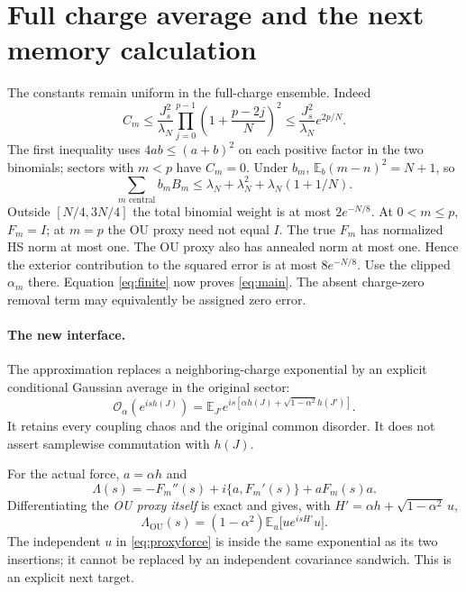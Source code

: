 \documentclass[11pt,a4paper]{article}
\newcommand{\EE}{\mathbb E}
\begin{document}
\newpage
\section{Full charge average and the next memory calculation}
The constants remain uniform in the full-charge ensemble. Indeed
\begin{equation}
 C_m\le\frac{J_s^2}{\lambda_N}
 \prod_{j=0}^{p-1}\left(1+\frac{p-2j}{N}\right)^2
 \le\frac{J_s^2}{\lambda_N}e^{2p/N}.
\end{equation}
The first inequality uses $4ab\le(a+b)^2$ on each positive factor
in the two binomials; sectors with $m<p$ have $C_m=0$.
Under $b_m$, $\EE_b(m-n)^2=N+1$, so
\begin{equation}
 \sum_{m\text{ central}}b_m B_m
 \le\lambda_N+\lambda_N^2+\lambda_N(1+1/N).
\end{equation}
Outside $[N/4,3N/4]$ the total binomial weight is at most
$2e^{-N/8}$. At $0<m\le p$, $F_m=I$; at $m=p$ the OU proxy
need not equal $I$. The true $F_m$ has normalized HS norm at most one.
The OU proxy also has annealed norm at most one. Hence the exterior
contribution to the squared error is at most $8e^{-N/8}$.
Use the clipped $\alpha_m$ there. Equation \eqref{eq:finite} now
proves \eqref{eq:main}. The absent charge-zero removal term may
equivalently be assigned zero error.

\paragraph{The new interface.}
The approximation replaces a neighboring-charge exponential by an
explicit conditional Gaussian average in the original sector:
\begin{equation}
 \mathcal O_\alpha(e^{ish(J)})
 =\EE_{J'}e^{is[\alpha h(J)+\sqrt{1-\alpha^2}h(J')]}.
\end{equation}
It retains every coupling chaos and the original common disorder.
It does not assert samplewise commutation with $h(J)$.

For the actual force, $a=\alpha h$ and
\begin{equation}
 \Lambda(s)=-F_m''(s)+i\{a,F_m'(s)\}+aF_m(s)a.
\end{equation}
Differentiating the \emph{OU proxy itself} is exact and gives,
with $H'=\alpha h+\sqrt{1-\alpha^2}\,u$,
\begin{equation}
 \Lambda_{\mathrm{OU}}(s)
 =(1-\alpha^2)\EE_u\big[u e^{isH'}u\big].
 \label{eq:proxyforce}
\end{equation}
The independent $u$ in \eqref{eq:proxyforce} is inside the same
exponential as its two insertions; it cannot be replaced by an
independent covariance sandwich. This is an explicit next target.
\end{document}
